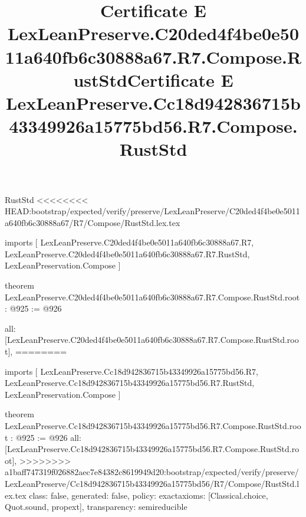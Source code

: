 \begin{lexlean}{RustStd}
<<<<<<<< HEAD:bootstrap/expected/verify/preserve/LexLeanPreserve/C20ded4f4be0e5011a640fb6c30888a67/R7/Compose/RustStd.lex.tex
\title{Certificate E LexLeanPreserve.C20ded4f4be0e5011a640fb6c30888a67.R7.Compose.RustStd}
\begin{coremodule}
imports [
  LexLeanPreserve.C20ded4f4be0e5011a640fb6c30888a67.R7,
  LexLeanPreserve.C20ded4f4be0e5011a640fb6c30888a67.R7.RustStd,
  LexLeanPreservation.Compose
]

theorem LexLeanPreserve.C20ded4f4be0e5011a640fb6c30888a67.R7.Compose.RustStd.root : @925 := @926 {
  all: [LexLeanPreserve.C20ded4f4be0e5011a640fb6c30888a67.R7.Compose.RustStd.root],
========
\title{Certificate E LexLeanPreserve.Cc18d942836715b43349926a15775bd56.R7.Compose.RustStd}
\begin{coremodule}
imports [
  LexLeanPreserve.Cc18d942836715b43349926a15775bd56.R7,
  LexLeanPreserve.Cc18d942836715b43349926a15775bd56.R7.RustStd,
  LexLeanPreservation.Compose
]

theorem LexLeanPreserve.Cc18d942836715b43349926a15775bd56.R7.Compose.RustStd.root : @925 := @926 {
  all: [LexLeanPreserve.Cc18d942836715b43349926a15775bd56.R7.Compose.RustStd.root],
>>>>>>>> a1baff747319f026882aec7e84382c8619949d20:bootstrap/expected/verify/preserve/LexLeanPreserve/Cc18d942836715b43349926a15775bd56/R7/Compose/RustStd.lex.tex
  class: false,
  generated: false,
  policy: exact{axioms: [Classical.choice, Quot.sound, propext]},
  transparency: semireducible
}


\end{coremodule}}
\end{coremodule}
\end{lexlean}
